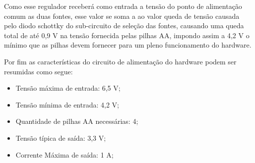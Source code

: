 Como esse regulador receberá como entrada a tensão do ponto de alimentação comum as duas fontes, esse valor se soma a ao valor queda de tensão causada pelo diodo schottky do sub-circuito de seleção das fontes, causando uma queda total de até 0,9 V na tensão fornecida pelas pilhas AA, impondo assim a 4,2 V o mínimo que as pilhas devem fornecer para um pleno funcionamento do hardware. 


Por fim as características do circuito de alimentação do hardware podem ser resumidas como segue:

\begin{itemize}
    \item Tensão máxima de entrada: 6,5 V;
    \item Tensão mínima de entrada: 4,2 V;
    \item Quantidade de pilhas AA necessárias: 4;
    \item Tensão típica de saída: 3,3 V;
    \item Corrente Máxima de saída: 1 A;
\end{itemize}
























